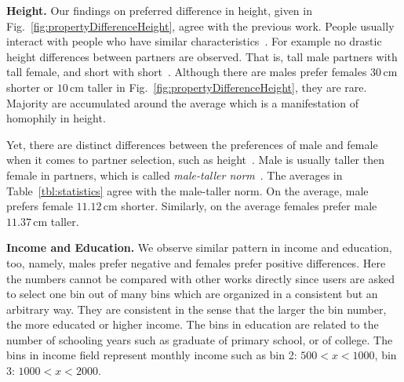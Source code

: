 \documentclass[journal,comsoc]{IEEEtran}
\newcommand{\hbIdea}[1]{{\color{red}{\scriptsize [{#1}]}}}
\newcommand{\reffig}[1]{Fig.~\ref{#1}}
\newcommand{\reftbl}[1]{Table~\ref{#1}}
\newcommand{\refcite}[1]{ref~\cite{#1}}
\begin{document}
%








\hbIdea{difference in partner selection} %
\textbf{Height.}
Our findings on preferred difference in height, given in \reffig{fig:propertyDifferenceHeight}, agree with the previous work.
People usually interact with people who have similar 
characteristics~\cite{
	McPherson2001,
	Centola2011Science}.
For example 
no drastic height differences between partners are observed.
That is, 
tall male partners with tall female, and short with 
short~\cite{
	Gillis1980,
	Swami2008}.
Although there are males prefer females 
$30$\,cm shorter
or 
$10$\,cm taller 
in \reffig{fig:propertyDifferenceHeight},
they are rare.
Majority are accumulated around the average
which is a
manifestation of homophily in height.

Yet, 
there are distinct differences between the preferences of male and female
when it comes to partner selection,
such as height~\cite{
	Gillis1980,
	Swami2008,
	Pawlowski2000Nature}.
Male is usually taller then female in partners,
which is called \emph{male-taller norm}~\cite{
	Gillis1980}.
The averages in \reftbl{tbl:statistics}
agree with the male-taller norm.
On the average, 
male prefers female 
$11.12$\,cm shorter.
Similarly, 
on the average
females prefer male 
$11.37$\,cm taller.

\textbf{Income and Education.}
We observe similar pattern in income and education, too,
namely,
males prefer negative and females prefer positive differences.
Here the numbers cannot be compared with other works directly
since 
users are asked to select one bin out of many bins 
which are organized in a consistent but an arbitrary way. 
They are consistent in the sense that the larger the bin number,
the more educated or higher income.
The bins in education are related to the number of schooling years
such as
graduate of primary school, or
of college.
The bins in income field represent monthly income such as 
bin 2: $500 < x < 1000$,
bin 3: $1000 < x < 2000$.
\end{document}
